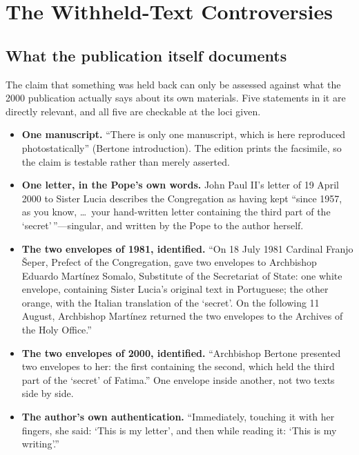 \section{The Withheld-Text Controversies}\label{sec:withheld}

\subsection{What the publication itself documents}

The claim that something was held back can only be assessed against
what the 2000 publication actually says about its own materials. Five
statements in it are directly relevant, and all five are checkable at
the loci given.

\begin{itemize}
\item \textbf{One manuscript.} ``There is only one manuscript, which
is here reproduced photostatically'' (Bertone introduction). The
edition prints the facsimile, so the claim is testable rather than
merely asserted.
\item \textbf{One letter, in the Pope's own words.} John Paul II's
letter of 19 April 2000 to Sister Lucia describes the Congregation as
having kept ``since 1957, as you know, \ldots\ your hand-written
letter containing the third part of the `secret'\,''---singular, and
written by the Pope to the author herself.
\item \textbf{The two envelopes of 1981, identified.} ``On 18 July
1981 Cardinal Franjo \v{S}eper, Prefect of the Congregation, gave two
envelopes to Archbishop Eduardo Mart\'inez Somalo, Substitute of the
Secretariat of State: one white envelope, containing Sister Lucia's
original text in Portuguese; the other orange, with the Italian
translation of the `secret'. On the following 11 August, Archbishop
Mart\'inez returned the two envelopes to the Archives of the Holy
Office.''
\item \textbf{The two envelopes of 2000, identified.} ``Archbishop
Bertone presented two envelopes to her: the first containing the
second, which held the third part of the `secret' of Fatima.'' One
envelope inside another, not two texts side by side.
\item \textbf{The author's own authentication.} ``Immediately,
touching it with her fingers, she said: `This is my letter', and then
while reading it: `This is my writing'.''
\end{itemize}

